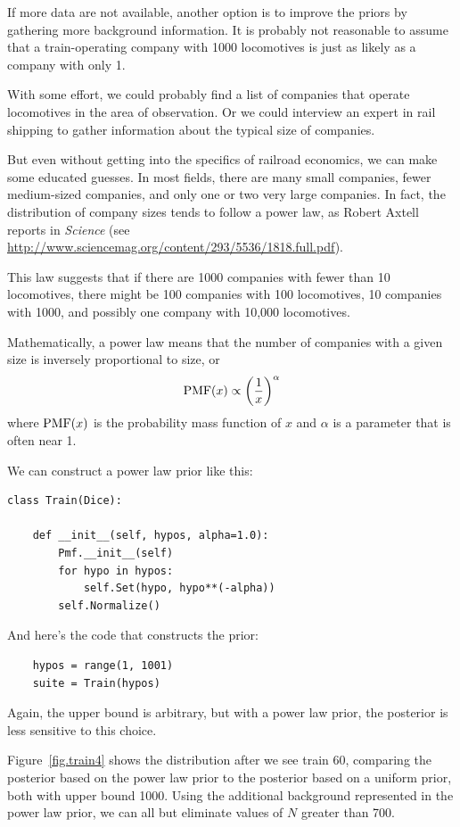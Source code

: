 \documentclass[12pt]{book}
\begin{document}
If more data are not available, another option is to improve the
priors by gathering more background information.  It is probably
not reasonable to assume that a train-operating company with 1000 locomotives
is just as likely as a company with only 1.

With some effort, we could probably find a list of companies that
operate locomotives in the area of observation.  Or we could
interview an expert in rail shipping to gather information about
the typical size of companies.

But even without getting into the specifics of railroad economics, we
can make some educated guesses.  In most fields, there are many small
companies, fewer medium-sized companies, and only one or two very
large companies.  In fact, the distribution of company sizes tends to
follow a power law, as Robert Axtell reports in {\it Science} (see
\url{http://www.sciencemag.org/content/293/5536/1818.full.pdf}).

This law suggests that if there are 1000 companies with fewer than
10 locomotives, there might be 100 companies with 100 locomotives,
10 companies with 1000, and possibly one company with 10,000 locomotives.

Mathematically, a power law means that the number of companies
with a given size is inversely proportional to size, or
%
\[ \mathrm{PMF}(x) \propto \left( \frac{1}{x} \right)^{\alpha}   \]
%
where $\mathrm{PMF}(x)$ is the probability mass function of $x$ and $\alpha$ is
a parameter that is often near 1.

We can construct a power law prior like this:

\begin{verbatim}
class Train(Dice):

    def __init__(self, hypos, alpha=1.0):
        Pmf.__init__(self)
        for hypo in hypos:
            self.Set(hypo, hypo**(-alpha))
        self.Normalize()
\end{verbatim}

And here's the code that constructs the prior:

\begin{verbatim}
    hypos = range(1, 1001)
    suite = Train(hypos)
\end{verbatim}

Again, the upper bound is arbitrary, but with a power law
prior, the posterior is less sensitive to this choice.

Figure~\ref{fig.train4} shows the distribution after
we see train 60, comparing the posterior based on the power
law prior to the posterior based on a uniform prior, both
with upper bound 1000.  Using the additional background
represented in the power law prior, we can all but eliminate
values of $N$ greater than 700.
\end{document}
